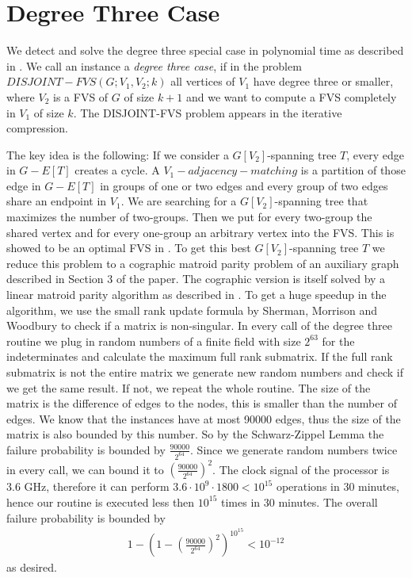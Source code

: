 \documentclass[11pt,a4paper]{scrartcl}
\begin{document}
\section{Degree Three Case}

We detect and solve the degree three special case in polynomial time as described in \cite{DBLP:journals/corr/abs-1004-1672}. We call an instance a \textit{degree three case}, if in the problem $DISJOINT-FVS(G; V_1, V_2; k)$ all vertices of $V_1$ have degree three or smaller, where $V_2$ is a FVS of $G$ of size $k+1$ and we want to compute a FVS completely in $V_1$ of size $k$. The DISJOINT-FVS problem appears in the iterative compression.


The key idea is the following: If we consider a $G[V_2]$-spanning tree $T$, every edge in $G - E[T]$ creates a cycle. A $V_1-adjacency-matching$ is a partition of those edge in $G - E[T]$ in groups of one or two edges and every group of two edges share an endpoint in $V_1$. We are searching for a $G[V_2]$-spanning tree that maximizes the number of two-groups. Then we put for every two-group the shared vertex and for every one-group an arbitrary vertex into the FVS. This is showed to be an optimal FVS in \cite{DBLP:journals/corr/abs-1004-1672}. To get this best $G[V_2]$-spanning tree $T$ we reduce this problem to a cographic matroid parity problem of an auxiliary graph described in Section 3 of the paper. The cographic version is itself solved by a linear matroid parity algorithm as described in \cite{Cheung:2014:AAL:2620785.2601066}. To get a huge speedup in the algorithm, we use the small rank update formula by Sherman, Morrison and Woodbury to check if a matrix is non-singular.
In every call of the degree three routine we plug in random numbers of a finite field with size $2^{63}$ for the indeterminates and calculate the maximum full rank submatrix. If the full rank submatrix is not the entire matrix we generate new random numbers and check if we get the same result. If not, we repeat the whole routine. The size of the matrix is the difference of edges to the nodes, this is smaller than the number of edges. We know that the instances have at most 90000 edges, thus the size of the matrix is also bounded by this number. So by the Schwarz-Zippel Lemma the failure probability is bounded by $\frac{90000}{2^{64}}$. Since we generate random numbers twice in every call, we can bound it to $(\frac{90000}{2^{64}})^2$. The clock signal of the processor is 3.6 GHz, therefore it can perform $3.6\cdot 10^9\cdot 1800<10^{15}$ operations in 30 minutes, hence our routine is executed less then $10^{15}$ times in 30 minutes. The overall failure probability is bounded by
\begin{align*}
1-\left(1-\left(\frac{90000}{2^{64}}\right)^2\right)^{10^{15}}<10^{-12}
\end{align*}
as desired.

\nocite{bafna1999}
\nocite{chen2008}


\end{document}
